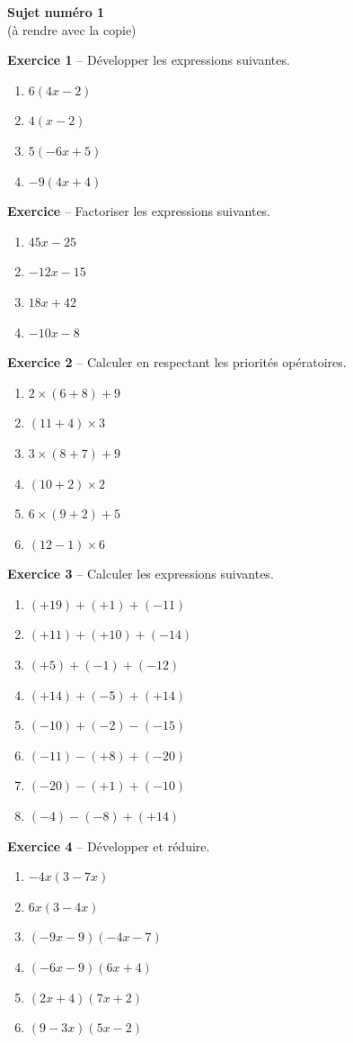 \documentclass[12pt,a4paper,french]{article}
\begin{document}
\begin{center}
\textbf{Sujet numéro 1}
\\(à rendre avec la copie)
\end{center}


\noindent\textbf{Exercice 1} -- Développer les expressions suivantes.
\begin{enumerate}
\item $6(4x - 2)$
\item $4(x - 2)$
\item $5(-6x + 5)$
\item $-9(4x + 4)$
\end{enumerate}
\noindent\textbf{Exercice} -- Factoriser les expressions suivantes.
\begin{enumerate}
\item $45x - 25$
\item $-12x - 15$
\item $18x + 42$
\item $-10x - 8$
\end{enumerate}
\bigskip

\noindent\textbf{Exercice 2} -- Calculer en respectant les priorités opératoires.
\begin{enumerate}
\item $2 \times (6 + 8) + 9$
\item $(11 + 4) \times 3$
\item $3 \times (8 + 7) + 9$
\item $(10 + 2) \times 2$
\item $6 \times (9 + 2) + 5$
\item $(12 - 1) \times 6$
\end{enumerate}
\bigskip

\noindent\textbf{Exercice 3} -- Calculer les expressions suivantes.
\begin{enumerate}
\item $(+19) + (+1) + (-11)$
\item $(+11) + (+10) + (-14)$
\item $(+5) + (-1) + (-12)$
\item $(+14) + (-5) + (+14)$
\item $(-10) + (-2) - (-15)$
\item $(-11) - (+8) + (-20)$
\item $(-20) - (+1) + (-10)$
\item $(-4) - (-8) + (+14)$
\end{enumerate}
\bigskip

\noindent\textbf{Exercice 4} -- Développer et réduire.
\begin{enumerate}
\item $-4x(3 - 7x)$
\item $6x(3 - 4x)$
\item $(-9x - 9)(-4x - 7)$
\item $(-6x - 9)(6x + 4)$
\item $(2x + 4)(7x + 2)$
\item $(9 - 3x)(5x - 2)$
\end{enumerate}
\bigskip
\end{document}
